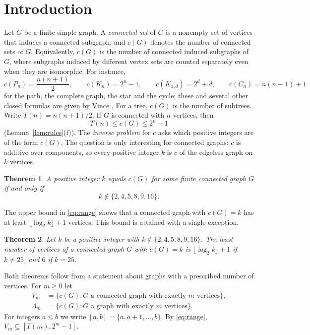 \documentclass[11pt]{amsart}
\newtheorem{theorem}{Theorem}[section]
\theoremstyle{definition}
\theoremstyle{remark}
\newcommand{\Lam}{\Lambda}
\newcommand{\Tr}[1]{T(#1)}
\begin{document}
\section{Introduction}\label{sec:intro}

Let $G$ be a finite simple graph. A \emph{connected set} of $G$ is a nonempty set of vertices that induces a connected subgraph, and $c(G)$ denotes the number of connected sets of $G$. Equivalently, $c(G)$ is the number of connected induced subgraphs of $G$, where subgraphs induced by different vertex sets are counted separately even when they are isomorphic. For instance,
\[
c(P_n)=\frac{n(n+1)}2,\qquad c(K_n)=2^n-1,\qquad c(K_{1,d})=2^d+d,\qquad c(C_n)=n(n-1)+1
\]
for the path, the complete graph, the star and the cycle; these and several other closed formulas are given by Vince \cite[Example~1]{Vi}. For a tree, $c(G)$ is the number of subtrees. Write $\Tr{n}=n(n+1)/2$. If $G$ is connected with $n$ vertices, then
\begin{equation}\label{eq:range}
\Tr{n}\le c(G)\le 2^n-1
\end{equation}
(Lemma~\ref{lem:rules}(f)). The \emph{inverse problem} for $c$ asks which positive integers are of the form $c(G)$. The question is only interesting for connected graphs: $c$ is additive over components, so every positive integer $k$ is $c$ of the edgeless graph on $k$ vertices.

\begin{theorem}\label{thm:main}
A positive integer $k$ equals $c(G)$ for some finite connected graph $G$ if and only if
\[
k\notin\{2,4,5,8,9,16\}.
\]
\end{theorem}

The upper bound in \eqref{eq:range} shows that a connected graph with $c(G)=k$ has at least $\lfloor\log_2k\rfloor+1$ vertices. This bound is attained with a single exception.

\begin{theorem}\label{thm:order}
Let $k$ be a positive integer with $k\notin\{2,4,5,8,9,16\}$. The least number of vertices of a connected graph $G$ with $c(G)=k$ is $\lfloor\log_2k\rfloor+1$ if $k\ne25$, and $6$ if $k=25$.
\end{theorem}

Both theorems follow from a statement about graphs with a prescribed number of vertices. For $m\ge0$ let
\begin{align*}
V_m&=\{c(G): G\text{ a connected graph with exactly }m\text{ vertices}\},\\
\Lam_m&=\{c(G): G\text{ a graph with exactly }m\text{ vertices}\}.
\end{align*}
For integers $a\le b$ we write $[a,b]=\{a,a+1,\dots,b\}$. By \eqref{eq:range}, $V_m\subseteq[\Tr{m},2^m-1]$.
\end{document}
